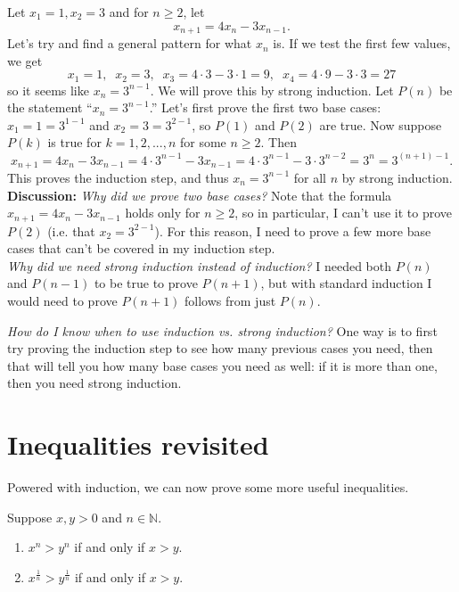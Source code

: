 \documentclass[11pt,dvipsnames]{book}
\numberwithin{figure}{section} %
\numberwithin{table}{section} %
\begin{document}
\begin{example}
Let $x_{1}=1, x_{2} =3$ and for $n\geq 2$, let
\[
x_{n+1} = 4x_{n}-3x_{n-1}.
\]
Let's try and find a general pattern for what $x_{n}$ is. If we test the first few values, we get
\[
x_{1} = 1, \;\; x_{2} = 3 , \;\; x_{3} = 4\cdot 3-3\cdot 1 = 9, \;\; x_{4} = 4\cdot 9 - 3\cdot 3 = 27
\]
so it seems like $x_{n} = 3^{n-1}$. We will prove this by strong induction. Let $P(n)$ be the statement ``$x_{n} = 3^{n-1}$.'' Let's first prove the first two base cases: $x_{1}=1=3^{1-1}$ and $x_{2}=3=3^{2-1}$, so $P(1)$ and $P(2)$ are true. Now  suppose $P(k)$ is true for $k=1,2,...,n$ for some $n\geq 2$. Then
\[
x_{n+1} =4x_{n}-3x_{n-1} = 4\cdot 3^{n-1} -3x_{n-1} = 4\cdot 3^{n-1} - 3\cdot 3^{n-2} = 3^{n} = 3^{(n+1)-1}.
\]
This proves the induction step, and thus $x_n=3^{n-1}$ for all $n$ by strong induction.\\

{\bf Discussion:} {\it Why did we prove two base cases?} Note that the formula $x_{n+1} =4x_{n}-3x_{n-1} $ holds only for $n\geq 2$, so in particular, I can't use it to prove $P(2)$ (i.e. that $x_{2}=3^{2-1}$). For this reason, I need to prove a few more base cases that can't be covered in my induction step. \\

{\it Why did we need strong induction instead of induction?}  I needed both $P(n)$ and $P(n-1)$ to be true to prove $P(n+1)$, but with standard induction I would need to prove $P(n+1)$ follows from just $P(n)$.\\
\end{example}

\begin{protip}
{\it How do I know when to use induction vs. strong induction?} One way is to first try proving the induction step to see how many previous cases you need, then that will tell you how many base cases you need as well: if it is more than one, then you need strong induction.
\end{protip}

\section{Inequalities revisited}%
\label{inequalitiesredux}

Powered with induction, we can now prove some more useful inequalities.

\begin{proposition}
Suppose $x,y>0$ and $n\in\mathbb{N}$.
\begin{enumerate}[label=(\alph*)]
\item $x^n>y^n$ if and only if $x>y$.
\item $x^{\frac{1}{n}}>y^{\frac{1}{n}}$ if and only if $x>y$.
\end{enumerate}
\end{proposition}
\end{document}
